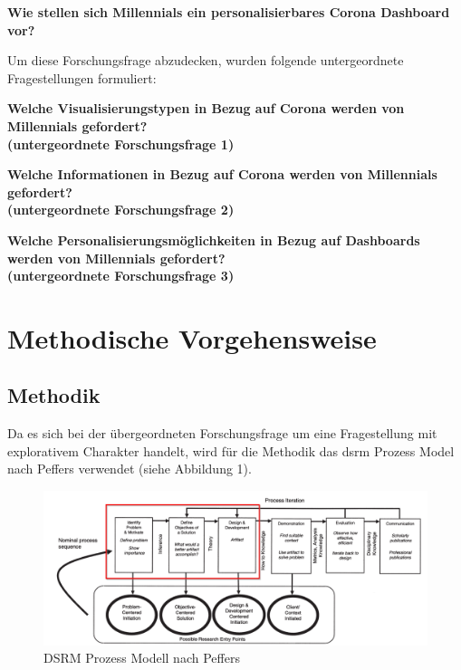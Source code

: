 \documentclass[12pt, oneside]{article}
\begin{document}
\begin{center}
\textbf{Wie stellen sich Millennials ein personalisierbares Corona Dashboard vor?}
\end{center}

Um diese Forschungsfrage abzudecken, wurden folgende untergeordnete Fragestellungen formuliert:

\begin{center}
\textbf{Welche Visualisierungstypen in Bezug auf Corona werden von Millennials gefordert?\\
(untergeordnete Forschungsfrage 1)}
\end{center}

\begin{center}
\textbf{Welche Informationen in Bezug auf Corona werden von Millennials gefordert?\\
(untergeordnete Forschungsfrage 2)}
\end{center}

\begin{center}
\textbf{Welche Personalisierungsmöglichkeiten in Bezug auf Dashboards werden von Millennials gefordert?\\
(untergeordnete Forschungsfrage 3)}
\end{center}

\clearpage
\section{Methodische Vorgehensweise}
\subsection{Methodik}
Da es sich bei der übergeordneten Forschungsfrage um eine Fragestellung mit explorativem Charakter handelt, wird für die Methodik das \Gls{dsrm} Prozess Model nach Peffers verwendet (siehe Abbildung 1).


\begin{figure}[ht]
	\includegraphics[width=12cm]{images/peffers_dsr_model.png}
	\centering
	\caption{DSRM Prozess Modell nach Peffers ~\citep{K.Peffers.2007}}
\end{figure}
\end{document}
